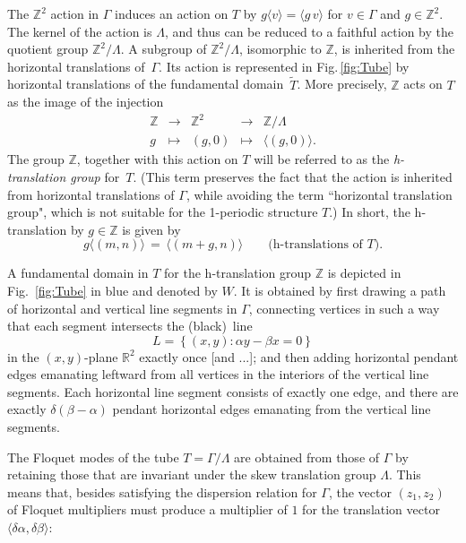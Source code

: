 \documentclass[12pt]{article}
\newcommand{\RR}{\mathbb{R}}
\newcommand{\ZZ}{\mathbb{Z}}
\newcommand{\notesps}[1]{{\color[rgb]{1,0.5,0}[#1]}}
\begin{document}
The $\ZZ^2$ action in $\Gamma$ induces an action on $T$ by $g\langle v \rangle = \langle g\,v \rangle$ for $v\in\Gamma$ and $g\in\ZZ^2$.  The kernel of the action is $\Lambda$, and thus can be reduced to a faithful action by the quotient group $\ZZ^2/\Lambda$.  A subgroup of $\ZZ^2/\Lambda$, isomorphic to $\ZZ$, is inherited from the horizontal translations of~$\Gamma$.  Its action is represented in Fig.\,\ref{fig:Tube} by horizontal translations of the fundamental domain~$\tilde T$.  More precisely, $\ZZ$ acts on $T$ as the image of the injection
%
\begin{equation}
\renewcommand{\arraystretch}{1.1}
\left.
\begin{array}{ccccc}
  \ZZ &\to& \ZZ^2 &\to& \ZZ/\Lambda  \\
  g &\mapsto& (g,0) &\mapsto& \langle (g,0) \rangle .
\end{array}
\right.
\end{equation}
%
The group $\ZZ$, together with this action on $T$ will be referred to as the {\itshape h-translation group} for~$T$.  (This term preserves the fact that the action is inherited from horizontal translations of $\Gamma$, while avoiding the term ``horizontal translation group", which is not suitable for the 1-periodic structure $T$.)  In short, the h-translation by $g\in\ZZ$ is given by
%
\begin{equation}
  g \langle (m,n) \rangle \,=\, \langle (m+g,n) \rangle
 \qquad
 \text{(h-translations of $T$)}.
\end{equation}
%

A fundamental domain in $T$ for the h-translation group $\ZZ$ is depicted in Fig.~\ref{fig:Tube} in blue and denoted by $W$.  It is obtained by first drawing a path of horizontal and vertical line segments in $\Gamma$, connecting vertices in such a way that each segment intersects the (black)~line
%
\begin{equation}
  L = \left\{ (x,y): \alpha y - \beta x = 0 \right\}  
\end{equation}
%
in the $(x,y)$-plane $\RR^2$ exactly once \notesps{and ...}; and then adding horizontal pendant edges emanating leftward from all vertices in the interiors of the vertical line segments.  Each horizontal line segment consists of exactly one edge, and there are exactly $\delta(\beta-\alpha)$ pendant horizontal edges emanating from the vertical line segments.

The Floquet modes of the tube $T=\Gamma/\Lambda$ are obtained from those of $\Gamma$ by retaining those that are invariant under the skew translation group $\Lambda$.  This means that, besides satisfying the dispersion relation for $\Gamma$, the vector $(z_1,z_2)$ of Floquet multipliers must produce a multiplier of $1$ for the translation vector $\langle \delta\alpha,\delta\beta \rangle$:
\end{document}
